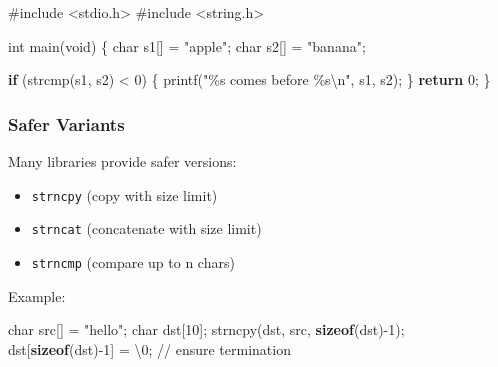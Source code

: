 \documentclass[
  letterpaper,
  DIV=11,
  numbers=noendperiod]{scrreprt}
\newenvironment{Shaded}{\begin{snugshade}}{\end{snugshade}}
\newcommand{\CharTok}[1]{\textcolor[rgb]{0.13,0.47,0.30}{#1}}
\newcommand{\CommentTok}[1]{\textcolor[rgb]{0.37,0.37,0.37}{#1}}
\newcommand{\ControlFlowTok}[1]{\textcolor[rgb]{0.00,0.23,0.31}{\textbf{#1}}}
\newcommand{\DataTypeTok}[1]{\textcolor[rgb]{0.68,0.00,0.00}{#1}}
\newcommand{\DecValTok}[1]{\textcolor[rgb]{0.68,0.00,0.00}{#1}}
\newcommand{\ImportTok}[1]{\textcolor[rgb]{0.00,0.46,0.62}{#1}}
\newcommand{\KeywordTok}[1]{\textcolor[rgb]{0.00,0.23,0.31}{\textbf{#1}}}
\newcommand{\NormalTok}[1]{\textcolor[rgb]{0.00,0.23,0.31}{#1}}
\newcommand{\OperatorTok}[1]{\textcolor[rgb]{0.37,0.37,0.37}{#1}}
\newcommand{\PreprocessorTok}[1]{\textcolor[rgb]{0.68,0.00,0.00}{#1}}
\newcommand{\SpecialCharTok}[1]{\textcolor[rgb]{0.37,0.37,0.37}{#1}}
\newcommand{\StringTok}[1]{\textcolor[rgb]{0.13,0.47,0.30}{#1}}
\providecommand{\tightlist}{%
  \setlength{\itemsep}{0pt}\setlength{\parskip}{0pt}}
\begin{document}
\begin{Shaded}
\begin{Highlighting}[]
\PreprocessorTok{\#include }\ImportTok{\textless{}stdio.h\textgreater{}}
\PreprocessorTok{\#include }\ImportTok{\textless{}string.h\textgreater{}}

\DataTypeTok{int}\NormalTok{ main}\OperatorTok{(}\DataTypeTok{void}\OperatorTok{)} \OperatorTok{\{}
    \DataTypeTok{char}\NormalTok{ s1}\OperatorTok{[]} \OperatorTok{=} \StringTok{"apple"}\OperatorTok{;}
    \DataTypeTok{char}\NormalTok{ s2}\OperatorTok{[]} \OperatorTok{=} \StringTok{"banana"}\OperatorTok{;}

    \ControlFlowTok{if} \OperatorTok{(}\NormalTok{strcmp}\OperatorTok{(}\NormalTok{s1}\OperatorTok{,}\NormalTok{ s2}\OperatorTok{)} \OperatorTok{\textless{}} \DecValTok{0}\OperatorTok{)} \OperatorTok{\{}
\NormalTok{        printf}\OperatorTok{(}\StringTok{"}\SpecialCharTok{\%s}\StringTok{ comes before }\SpecialCharTok{\%s\textbackslash{}n}\StringTok{"}\OperatorTok{,}\NormalTok{ s1}\OperatorTok{,}\NormalTok{ s2}\OperatorTok{);}
    \OperatorTok{\}}
    \ControlFlowTok{return} \DecValTok{0}\OperatorTok{;}
\OperatorTok{\}}
\end{Highlighting}
\end{Shaded}

\subsubsection{Safer Variants}\label{safer-variants}

Many libraries provide safer versions:

\begin{itemize}
\tightlist
\item
  \texttt{strncpy} (copy with size limit)
\item
  \texttt{strncat} (concatenate with size limit)
\item
  \texttt{strncmp} (compare up to n chars)
\end{itemize}

Example:

\begin{Shaded}
\begin{Highlighting}[]
\DataTypeTok{char}\NormalTok{ src}\OperatorTok{[]} \OperatorTok{=} \StringTok{"hello"}\OperatorTok{;}
\DataTypeTok{char}\NormalTok{ dst}\OperatorTok{[}\DecValTok{10}\OperatorTok{];}
\NormalTok{strncpy}\OperatorTok{(}\NormalTok{dst}\OperatorTok{,}\NormalTok{ src}\OperatorTok{,} \KeywordTok{sizeof}\OperatorTok{(}\NormalTok{dst}\OperatorTok{){-}}\DecValTok{1}\OperatorTok{);}
\NormalTok{dst}\OperatorTok{[}\KeywordTok{sizeof}\OperatorTok{(}\NormalTok{dst}\OperatorTok{){-}}\DecValTok{1}\OperatorTok{]} \OperatorTok{=} \CharTok{\textquotesingle{}}\SpecialCharTok{\textbackslash{}0}\CharTok{\textquotesingle{}}\OperatorTok{;}   \CommentTok{// ensure termination}
\end{Highlighting}
\end{Shaded}
\end{document}
